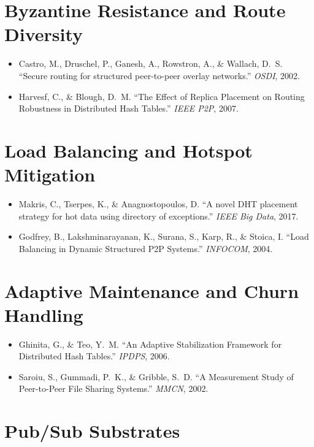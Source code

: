 \documentclass[twoside,nobib]{tufte-book}
\begin{document}
\section*{Byzantine Resistance and Route Diversity}

\begin{itemize}\setlength\itemsep{0.2em}
  \item Castro, M., Druschel, P., Ganesh, A., Rowstron, A., \&
    Wallach, D.~S. ``Secure routing for structured peer-to-peer
    overlay networks.'' \emph{OSDI}, 2002.
  \item Harvesf, C., \& Blough, D.~M. ``The Effect of Replica
    Placement on Routing Robustness in Distributed Hash
    Tables.'' \emph{IEEE P2P}, 2007.
\end{itemize}

\section*{Load Balancing and Hotspot Mitigation}

\begin{itemize}\setlength\itemsep{0.2em}
  \item Makris, C., Tserpes, K., \& Anagnostopoulos, D. ``A novel
    DHT placement strategy for hot data using directory of
    exceptions.'' \emph{IEEE Big Data}, 2017.
  \item Godfrey, B., Lakshminarayanan, K., Surana, S., Karp, R.,
    \& Stoica, I. ``Load Balancing in Dynamic Structured P2P
    Systems.'' \emph{INFOCOM}, 2004.
\end{itemize}

\section*{Adaptive Maintenance and Churn Handling}

\begin{itemize}\setlength\itemsep{0.2em}
  \item Ghinita, G., \& Teo, Y.~M. ``An Adaptive Stabilization
    Framework for Distributed Hash Tables.'' \emph{IPDPS},
    2006.
  \item Saroiu, S., Gummadi, P.~K., \& Gribble, S.~D. ``A
    Measurement Study of Peer-to-Peer File Sharing Systems.''
    \emph{MMCN}, 2002.
\end{itemize}

\section*{Pub/Sub Substrates}
\end{document}
